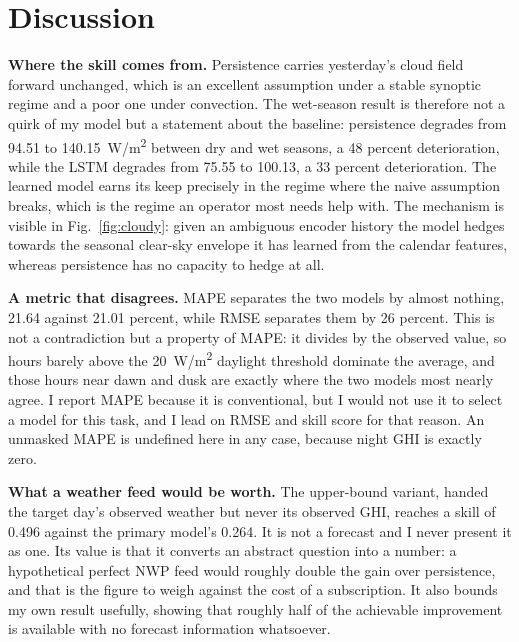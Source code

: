 \documentclass{article}
\begin{document}
\section{Discussion}

\textbf{Where the skill comes from.} Persistence carries yesterday's cloud field
forward unchanged, which is an excellent assumption under a stable synoptic
regime and a poor one under convection. The wet-season result is therefore not a
quirk of my model but a statement about the baseline: persistence degrades from
94.51 to 140.15~W/m\textsuperscript{2} between dry and wet seasons, a 48 percent
deterioration, while the LSTM degrades from 75.55 to 100.13, a 33 percent
deterioration. The learned model earns its keep precisely in the regime where the
naive assumption breaks, which is the regime an operator most needs help with.
The mechanism is visible in Fig.~\ref{fig:cloudy}: given an ambiguous encoder
history the model hedges towards the seasonal clear-sky envelope it has learned
from the calendar features, whereas persistence has no capacity to hedge at all.

\textbf{A metric that disagrees.} MAPE separates the two models by almost
nothing, 21.64 against 21.01 percent, while RMSE separates them by 26 percent.
This is not a contradiction but a property of MAPE: it divides by the observed
value, so hours barely above the 20~W/m\textsuperscript{2} daylight threshold
dominate the average, and those hours near dawn and dusk are exactly where the
two models most nearly agree. I report MAPE because it is conventional, but I
would not use it to select a model for this task, and I lead on RMSE and skill
score for that reason. An unmasked MAPE is undefined here in any case, because
night GHI is exactly zero.

\textbf{What a weather feed would be worth.} The upper-bound variant, handed the
target day's observed weather but never its observed GHI, reaches a skill of
0.496 against the primary model's 0.264. It is not a forecast and I never present
it as one. Its value is that it converts an abstract question into a number: a
hypothetical perfect NWP feed would roughly double the gain over persistence, and
that is the figure to weigh against the cost of a subscription. It also bounds my
own result usefully, showing that roughly half of the achievable improvement is
available with no forecast information whatsoever.
\end{document}
